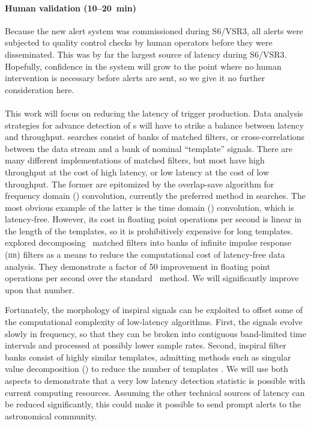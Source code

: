 \paragraph{Human validation (10--20~min)}%
Because the new alert system was commissioned during S6/VSR3, all alerts were subjected
to quality control checks by human operators before they were disseminated.
This was by far the largest source of latency during S6/VSR3.
Hopefully, confidence in the system will grow to the point where no human intervention
is necessary before alerts are sent, so we give it no further consideration here.

\paragraph{}

This work will focus on reducing the latency of trigger production.  Data analysis
strategies for advance detection of \CBC{}s will have to strike a balance between latency
and throughput. \CBC{} searches consist of banks of
matched filters, or cross-correlations between the data stream and a bank of
nominal ``template'' signals.  There are many different implementations of
matched filters, but most have high throughput at the cost of high latency, or
low latency at the cost of low throughput.  The former are epitomized by the
overlap-save algorithm for frequency domain (\FD) convolution, currently the
preferred method in \GW{} searches.  The most obvious example of the latter is
the time domain (\TD) convolution, which is latency-free.  However, its cost in floating
point operations per second is linear in the length of the templates, so it is
prohibitively expensive for long templates.  \citet{shaunIIR} explored decomposing
\CBC\ matched filters into banks of infinite impulse response (\textsc{iir})
filters as a means to reduce the computational cost of latency-free data analysis.  They
demonstrate a factor of 50 improvement in floating point operations per second
over the standard \TD\ method.  We will significantly improve upon that number.

Fortunately, the morphology of inspiral signals can be exploited to offset some
of the computational complexity of low-latency algorithms.  First, the signals
evolve slowly in frequency, so that they can be broken into contiguous
band-limited time intervals and processed at possibly lower sample rates.
Second, inspiral filter banks consist of highly similar templates, admitting
methods such as singular value decomposition (\SVD{}) to reduce the number of
templates \citep{Cannon:2010p10398}. We will use both aspects to demonstrate
that a very low latency detection statistic is possible with current computing
resources.  Assuming the other technical sources of latency can be reduced
significantly, this could make it possible to send prompt alerts to the
astronomical community.

